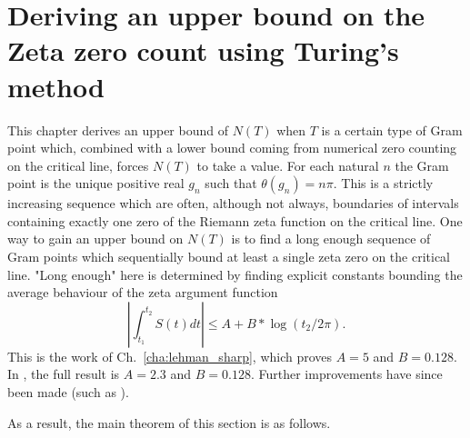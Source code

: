 \chapter{Deriving an upper bound on the Zeta zero count using Turing's method}
\label{cha:n_upper_bound}

This chapter derives an upper bound of $N(T)$ when $T$ is a certain type of
Gram point which, combined with a lower bound coming from numerical zero
counting on the critical line, forces $N(T)$ to take a value. 
For each natural $n$ the Gram point is the unique positive real $g_n$ such that 
$\theta(g_n) = n\pi$.
This is a strictly increasing sequence which are often, although not always, 
boundaries of intervals containing exactly one zero of the Riemann zeta 
function on the critical line.
One way to gain an upper bound on $N(T)$ is to find a long enough
sequence of Gram points which sequentially bound at least a single 
zeta zero on the critical line.
"Long enough" here is determined by finding explicit constants bounding 
the average behaviour of the zeta argument function
\[
  \left|\int_{t_1}^{t_2} S(t) dt\right| \leq A + B * \log(t_2/2\pi).
\]
This is the work of Ch.~\ref{cha:lehman_sharp}, which proves
$A = 5$ and $B = 0.128$.
In \cite{Lehman1970}, the full result is $A = 2.3$ and $B = 0.128$.
Further improvements have since been made (such as \cite{TrudgianTuring}).

As a result, the main theorem of this section is as follows.

